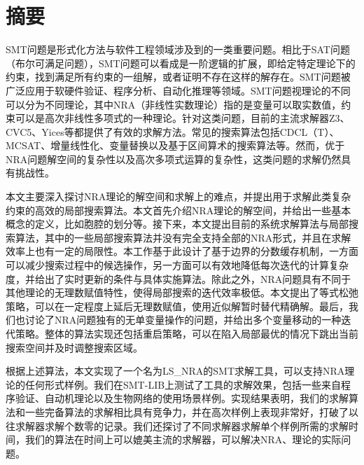 \maketitle%
\MAKETITLE%
\makedeclaration%
\intobmk\chapter*{摘\quad 要}%
\setcounter{page}{1}%

SMT问题是形式化方法与软件工程领域涉及到的一类重要问题。相比于SAT问题（布尔可满足问题），SMT问题可以看成是一阶逻辑的扩展，即给定特定理论下的约束，找到满足所有约束的一组解，或者证明不存在这样的解存在。SMT问题被广泛应用于软硬件验证、程序分析、自动化推理等领域。SMT问题视理论的不同可以分为不同理论，其中NRA（非线性实数理论）指的是变量可以取实数值，约束可以是高次非线性多项式的一种理论。针对这类问题，目前的主流求解器Z3、CVC5、Yices等都提供了有效的求解方法。常见的搜索算法包括CDCL（T）、MCSAT、增量线性化、变量替换以及基于区间算术的搜索算法等。然而，优于NRA问题解空间的复杂性以及高次多项式运算的复杂性，这类问题的求解仍然具有挑战性。

本文主要深入探讨NRA理论的解空间和求解上的难点，并提出用于求解此类复杂约束的高效的局部搜索算法。本文首先介绍NRA理论的解空间，并给出一些基本概念的定义，比如胞腔的划分等。接下来，本文提出目前的系统求解算法与局部搜索算法，其中的一些局部搜索算法并没有完全支持全部的NRA形式，并且在求解效率上也有一定的局限性。本工作基于此设计了基于边界的分数缓存机制，一方面可以减少搜索过程中的候选操作，另一方面可以有效地降低每次迭代的计算复杂度，并给出了实时更新的条件与具体实施算法。除此之外，NRA问题具有不同于其他理论的无理数赋值特性，使得局部搜索的迭代效率极低。本文提出了等式松弛策略，可以在一定程度上延后无理数赋值，使用近似解暂时替代精确解。最后，我们也讨论了NRA问题独有的无单变量操作的问题，并给出多个变量移动的一种迭代策略。整体的算法实现还包括重启策略，可以在陷入局部最优的情况下跳出当前搜索空间并及时调整搜索区域。

根据上述算法，本文实现了一个名为LS\_NRA的SMT求解工具，可以支持NRA理论的任何形式样例。我们在SMT-LIB上测试了工具的求解效果，包括一些来自程序验证、自动机理论以及生物网络的使用场景样例。实现结果表明，我们的求解算法和一些完备算法的求解相比具有竞争力，并在高次样例上表现非常好，打破了以往求解器求解个数零的记录。我们还探讨了不同求解器求解单个样例所需的求解时间，我们的算法在时间上可以媲美主流的求解器，可以解决NRA、理论的实际问题。


